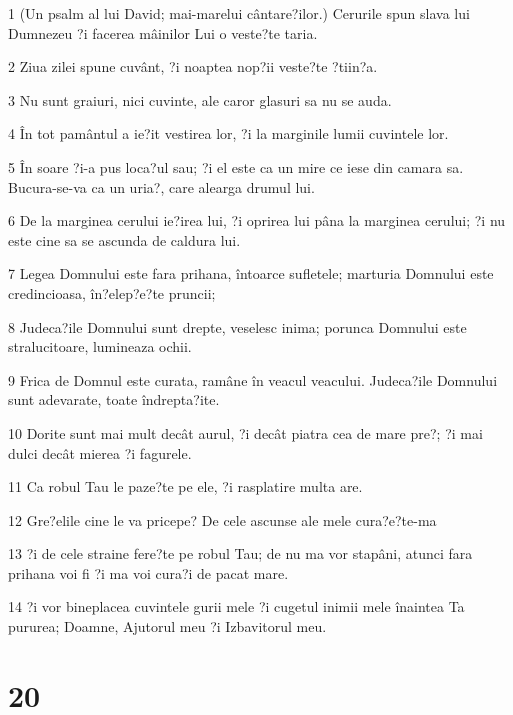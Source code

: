 \par 1 (Un psalm al lui David; mai-marelui cântare?ilor.) Cerurile spun slava lui Dumnezeu ?i facerea mâinilor Lui o veste?te taria.
\par 2 Ziua zilei spune cuvânt, ?i noaptea nop?ii veste?te ?tiin?a.
\par 3 Nu sunt graiuri, nici cuvinte, ale caror glasuri sa nu se auda.
\par 4 În tot pamântul a ie?it vestirea lor, ?i la marginile lumii cuvintele lor.
\par 5 În soare ?i-a pus loca?ul sau; ?i el este ca un mire ce iese din camara sa. Bucura-se-va ca un uria?, care alearga drumul lui.
\par 6 De la marginea cerului ie?irea lui, ?i oprirea lui pâna la marginea cerului; ?i nu este cine sa se ascunda de caldura lui.
\par 7 Legea Domnului este fara prihana, întoarce sufletele; marturia Domnului este credincioasa, în?elep?e?te pruncii;
\par 8 Judeca?ile Domnului sunt drepte, veselesc inima; porunca Domnului este stralucitoare, lumineaza ochii.
\par 9 Frica de Domnul este curata, ramâne în veacul veacului. Judeca?ile Domnului sunt adevarate, toate îndrepta?ite.
\par 10 Dorite sunt mai mult decât aurul, ?i decât piatra cea de mare pre?; ?i mai dulci decât mierea ?i fagurele.
\par 11 Ca robul Tau le paze?te pe ele, ?i rasplatire multa are.
\par 12 Gre?elile cine le va pricepe? De cele ascunse ale mele cura?e?te-ma
\par 13 ?i de cele straine fere?te pe robul Tau; de nu ma vor stapâni, atunci fara prihana voi fi ?i ma voi cura?i de pacat mare.
\par 14 ?i vor bineplacea cuvintele gurii mele ?i cugetul inimii mele înaintea Ta pururea; Doamne, Ajutorul meu ?i Izbavitorul meu.

\chapter{20}

